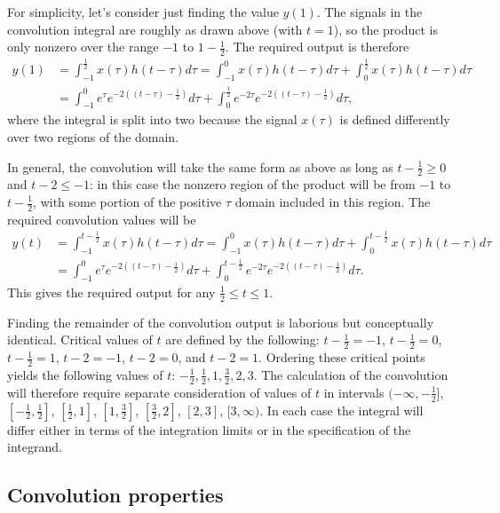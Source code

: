 \documentclass[10pt]{beamer}
\begin{document}
For simplicity, let's consider just finding the value $y(1)$.  The signals in the convolution integral are roughly as drawn above (with $t=1$), so the product is only nonzero over the range $-1$ to $1 - \frac{1}{2}$.  The required output is therefore 
\begin{align*}
  y(1) &= \int_{-1}^{\frac{1}{2}} x(\tau) h(t-\tau) d\tau 
  = \int_{-1}^0 x(\tau) h(t-\tau) d\tau + \int_0^{\frac{1}{2}} x(\tau) h(t-\tau) d\tau \\
  &= \int_{-1}^{0} e^{\tau} e^{-2((t-\tau)-\frac{1}{2})} d\tau + \int_{0}^{\frac{1}{2}} e^{-2\tau} e^{-2((t-\tau)-\frac{1}{2})} d\tau,
\end{align*}
where the integral is split into two because the signal $x(\tau)$ is defined differently over two regions of the domain.  

In general, the convolution will take the same form as above as long as $t-\frac{1}{2} \geq 0$ and $t-2 \leq -1$:  in this case the nonzero region of the product will be from $-1$ to $t-\frac{1}{2}$, with some portion of the positive $\tau$ domain included in this region.  The required convolution values will be
\begin{align*}
  y(t) &= \int_{-1}^{t-\frac{1}{2}} x(\tau) h(t-\tau) d\tau 
  = \int_{-1}^0 x(\tau) h(t-\tau) d\tau + \int_0^{t-\frac{1}{2}} x(\tau) h(t-\tau) d\tau \\
  &= \int_{-1}^{0} e^{\tau} e^{-2((t-\tau)-\frac{1}{2})} d\tau + \int_{0}^{t-\frac{1}{2}} e^{-2\tau} e^{-2((t-\tau)-\frac{1}{2})} d\tau.
\end{align*}
This gives the required output for any $\frac{1}{2} \leq t \leq 1$.

Finding the remainder of the convolution output is laborious but conceptually identical.  Critical values of $t$ are defined by the following:  $t-\frac{1}{2} = -1$, $t-\frac{1}{2} = 0$, $t-\frac{1}{2} = 1$, $t-2 = -1$, $t-2 = 0$, and $t-2 = 1$.  Ordering these critical points yields the following values of $t$:  $-\frac{1}{2}, \frac{1}{2}, 1, \frac{3}{2}, 2, 3$.  The calculation of the convolution will therefore require separate consideration of values of $t$ in intervals $(-\infty, -\frac{1}{2}]$, $[-\frac{1}{2}, \frac{1}{2}]$, $[\frac{1}{2}, 1]$, $[1, \frac{3}{2}]$, $[\frac{3}{2}, 2]$, $[2, 3]$, $[3, \infty)$.  In each case the integral will differ either in terms of the integration limits or in the specification of the integrand.

\subsection{Convolution properties}
\end{document}
